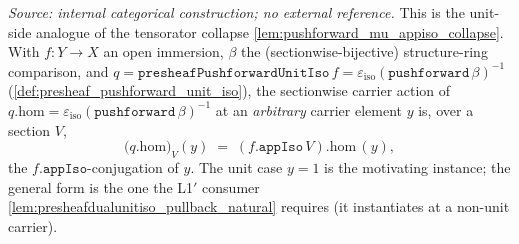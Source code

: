 \begin{lemma}

  \label{lem:pushforward_beta_unit_eps_app_one}
  \textit{Source: internal categorical construction; no external reference.}
  This is the unit-side analogue of the tensorator collapse
  \cref{lem:pushforward_mu_appiso_collapse}. With \(f : Y \to X\) an open immersion,
  \(\beta\) the (sectionwise-bijective) structure-ring comparison, and
  \(q = \mathtt{presheafPushforwardUnitIso}\,f = \varepsilon_{\mathrm{iso}}(\mathtt{pushforward}\,
  \beta)^{-1}\) (\cref{def:presheaf_pushforward_unit_iso}), the sectionwise carrier action of
  \(q.\mathrm{hom} = \varepsilon_{\mathrm{iso}}(\mathtt{pushforward}\,\beta)^{-1}\) at an
  \emph{arbitrary} carrier element \(y\) is, over a section \(V\),
  \[
    \bigl(q.\mathrm{hom}\bigr)_V (y)
      \;=\; (f.\mathtt{appIso}\,V).\mathrm{hom}\,(y) ,
  \]
  the \(f.\mathtt{appIso}\)-conjugation of \(y\). The unit case \(y = 1\) is the motivating
  instance; the general form is the one the L1\('\) consumer
  \cref{lem:presheafdualunitiso_pullback_natural} requires (it instantiates at a non-unit
  carrier).
\end{lemma}
